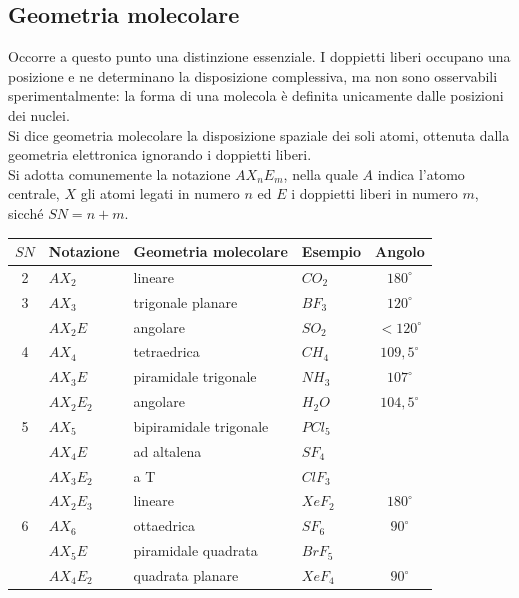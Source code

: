 \subsection{Geometria molecolare}

Occorre a questo punto una distinzione essenziale. I doppietti liberi occupano una posizione e ne determinano la disposizione complessiva, ma non sono osservabili sperimentalmente: la forma di una molecola è definita unicamente dalle posizioni dei nuclei.\\

Si dice geometria molecolare la disposizione spaziale dei soli atomi, ottenuta dalla geometria elettronica ignorando i doppietti liberi.\\

Si adotta comunemente la notazione $AX_nE_m$, nella quale $A$ indica l'atomo centrale, $X$ gli atomi legati in numero $n$ ed $E$ i doppietti liberi in numero $m$, sicché $SN = n+m$.

\begin{center}
    \begin{tabular}{clllc}
        \toprule
        $SN$ & Notazione & Geometria molecolare & Esempio & Angolo \\
        \midrule
        2 & $AX_2$    & lineare                & $CO_2$    & $180^\circ$ \\
        \midrule
        3 & $AX_3$    & trigonale planare      & $BF_3$    & $120^\circ$ \\
          & $AX_2E$   & angolare               & $SO_2$    & $<120^\circ$ \\
        \midrule
        4 & $AX_4$    & tetraedrica            & $CH_4$    & $109{,}5^\circ$ \\
          & $AX_3E$   & piramidale trigonale   & $NH_3$    & $107^\circ$ \\
          & $AX_2E_2$ & angolare               & $H_2O$    & $104{,}5^\circ$ \\
        \midrule
        5 & $AX_5$    & bipiramidale trigonale & $PCl_5$   & \\
          & $AX_4E$   & ad altalena            & $SF_4$    & \\
          & $AX_3E_2$ & a T                    & $ClF_3$   & \\
          & $AX_2E_3$ & lineare                & $XeF_2$   & $180^\circ$ \\
        \midrule
        6 & $AX_6$    & ottaedrica             & $SF_6$    & $90^\circ$ \\
          & $AX_5E$   & piramidale quadrata    & $BrF_5$   & \\
          & $AX_4E_2$ & quadrata planare       & $XeF_4$   & $90^\circ$ \\
        \bottomrule
    \end{tabular}
\end{center}

